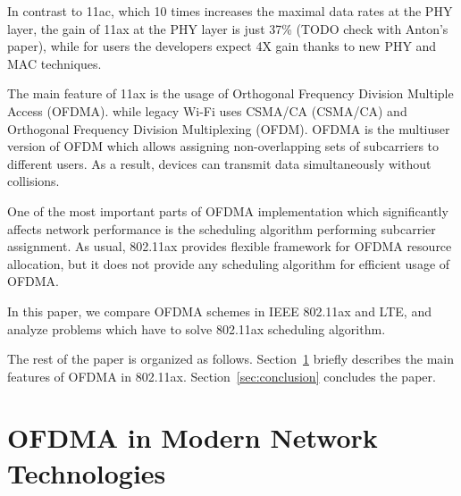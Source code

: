 \documentclass[conference]{IEEEtran}
\begin{document}
In contrast to 11ac, which 10 times increases the maximal data rates at the PHY layer, the gain of 11ax at the PHY layer is just 37\% (TODO check with Anton's paper), while for users the developers expect 4X gain thanks to new PHY and MAC techniques.     


The main feature of 11ax is the usage of  Orthogonal Frequency Division Multiple Access (OFDMA).  while legacy Wi-Fi uses CSMA/CA (CSMA/CA) and Orthogonal Frequency Division Multiplexing (OFDM). OFDMA is the multiuser version of OFDM which allows assigning non-overlapping sets of subcarriers to different users. As a result, devices can transmit data simultaneously without collisions.




One of the most important parts of OFDMA implementation which significantly affects network performance is the scheduling algorithm performing subcarrier assignment. As usual, 802.11ax provides flexible framework for OFDMA resource allocation, but it does not provide any scheduling algorithm for efficient usage of OFDMA.

In this paper, we compare OFDMA schemes in IEEE 802.11ax and LTE, and analyze problems which have to solve 802.11ax scheduling algorithm.

The rest of the paper is organized as follows.  Section~\ref{sec:ofdma} briefly describes the main features of OFDMA in 802.11ax. Section~\ref{sec:conclusion} concludes the paper. 

\section{OFDMA in Modern Network Technologies}
\label{sec:ofdma}
\end{document}
